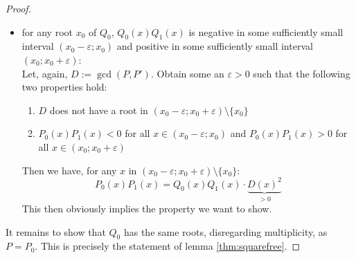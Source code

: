 \documentclass[11pt,a4paper,oneside]{article}
\renewcommand{\epsilon}{\varepsilon}
\begin{document}
\begin{proof}
\begin{itemize}
\item for any root $x_0$ of $Q_0$, $Q_0(x)Q_1(x)$ is negative in some sufficiently small interval $(x_0-\epsilon;x_0)$ and positive in some sufficiently small interval $(x_0;x_0+\epsilon)$:\\
Let, again, $D:=\gcd(P, P')$. Obtain some an $\epsilon>0$ such that the following two properties hold:
\begin{enumerate}
\item $D$ does not have a root in $(x_0-\epsilon; x_0+\epsilon)\setminus\{x_0\}$
\item $P_0(x)P_1(x)<0$ for all $x\in (x_0-\epsilon; x_0)$ and $P_0(x)P_1(x)>0$ for all $x\in (x_0;x_0+\epsilon)$ %
\end{enumerate}
Then we have, for any $x$ in $(x_0-\epsilon; x_0+\epsilon)\setminus\{x_0\}$:
$$P_0(x)P_1(x) = Q_0(x)Q_1(x)\cdot \underbrace{D(x)^2}_{>0}$$
This then obviously implies the property we want to show.
\end{itemize}
It remains to show that $Q_0$ has the same roots, disregarding multiplicity, as $P = P_0$. This is precisely the statement of lemma \ref{thm:squarefree}.
\end{proof}
\end{document}
